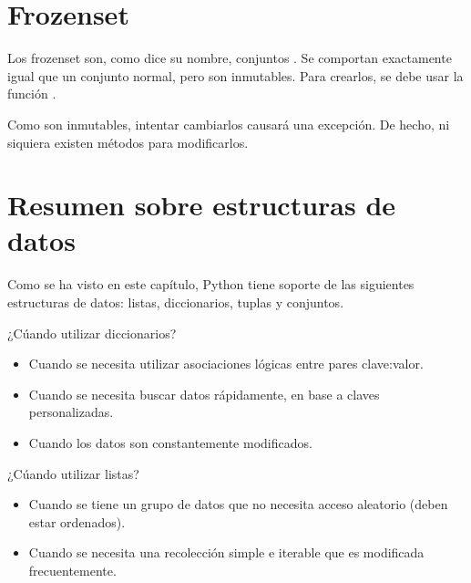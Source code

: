 \section{Frozenset}

Los frozenset son, como dice su nombre, conjuntos .
Se comportan exactamente igual que un conjunto normal, pero son inmutables.
Para crearlos, se debe usar la función .


Como son inmutables, intentar cambiarlos causará una excepción.
De hecho, ni siquiera existen métodos para modificarlos.


\section{Resumen sobre estructuras de datos}

Como se ha visto en este capítulo, Python tiene soporte de las siguientes estructuras de datos: listas, diccionarios, tuplas y conjuntos.

¿Cúando utilizar diccionarios?

\begin{itemize}
  \item Cuando se necesita utilizar asociaciones lógicas entre pares clave:valor.
  
  \item Cuando se necesita buscar datos rápidamente, en base a claves personalizadas.
  
  \item Cuando los datos son constantemente modificados.
  
\end{itemize}

¿Cúando utilizar listas?

\begin{itemize}
  \item Cuando se tiene un grupo de datos que no necesita acceso aleatorio (deben estar ordenados).
  
  \item Cuando se necesita una recolección simple e iterable que es modificada frecuentemente.
  
\end{itemize}

